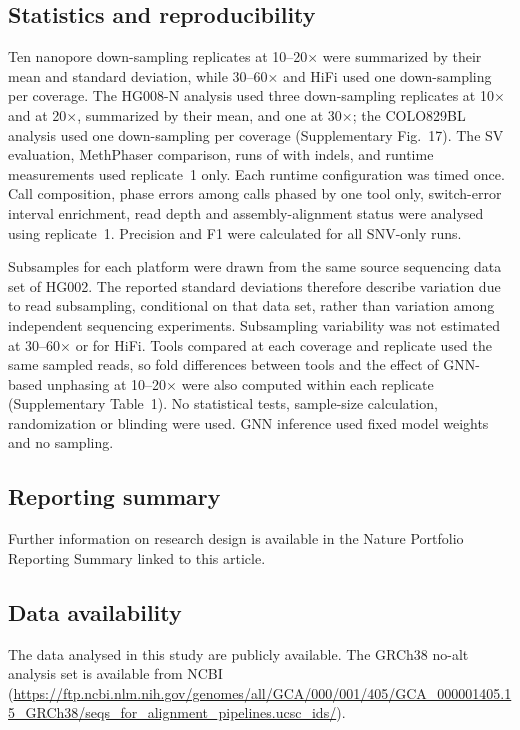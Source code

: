 \subsection*{Statistics and reproducibility}
Ten nanopore down-sampling replicates at 10--20$\times$ were summarized by their mean and standard deviation, while 30--60$\times$ and HiFi used one down-sampling per coverage.  The HG008-N analysis used three down-sampling replicates at 10$\times$ and at 20$\times$, summarized by their mean, and one at 30$\times$; the COLO829BL analysis used one down-sampling per coverage (Supplementary Fig.~17).  The SV evaluation, MethPhaser comparison, runs of \hapcut with indels, and runtime measurements used replicate~1 only. Each runtime configuration was timed once. Call composition, phase errors among calls phased by one tool only, switch-error interval enrichment, read depth and assembly-alignment status were analysed using replicate~1. Precision and F1 were calculated for all SNV-only runs.

Subsamples for each platform were drawn from the same source sequencing data set of HG002. The reported standard deviations therefore describe variation due to read subsampling, conditional on that data set, rather than variation among independent sequencing experiments. Subsampling variability was not estimated at 30--60$\times$ or for HiFi. Tools compared at each coverage and replicate used the same sampled reads, so fold differences between tools and the effect of GNN-based unphasing at 10--20$\times$ were also computed within each replicate (Supplementary Table~1).  No statistical tests, sample-size calculation, randomization or blinding were used.  GNN inference used fixed model weights and no sampling.


\subsection*{Reporting summary}
Further information on research design is available in the Nature Portfolio Reporting Summary linked to this article.

\subsection*{Data availability}
The data analysed in this study are publicly available. The GRCh38 no-alt analysis set is available from NCBI (\url{https://ftp.ncbi.nlm.nih.gov/genomes/all/GCA/000/001/405/GCA_000001405.15_GRCh38/seqs_for_alignment_pipelines.ucsc_ids/}).

